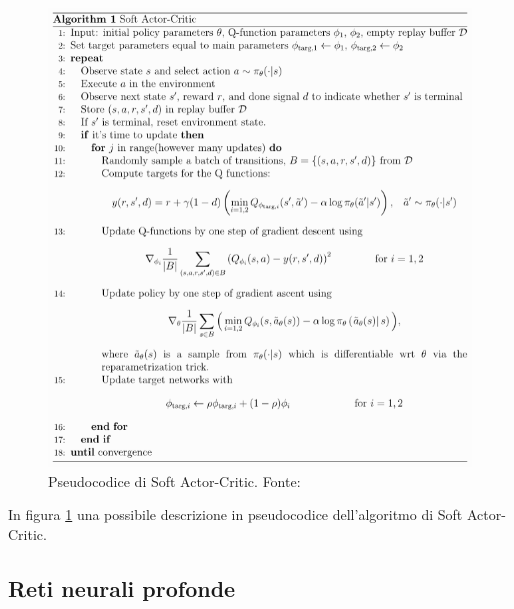 \begin{figure}[h!]
    \centering
    \includegraphics[width=0.65\linewidth]{immagini/sac_algo.png}
    \caption{Pseudocodice di Soft Actor-Critic. Fonte: \cite{openaiSAC2023}}
    \label{fig:sac_algo}
\end{figure}

In figura \ref{fig:sac_algo} una possibile descrizione in pseudocodice dell'algoritmo di Soft Actor-Critic.


\subsection{Reti neurali profonde}
